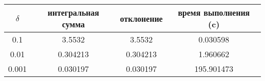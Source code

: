 \begin{tabular}{|c|c|c|c|}
    \hline
    $\delta$ & интегральная сумма & отклонение & время выполнения (c)\\
    \hline
    0.1 & 3.5532 & 3.5532 & 0.030598\\
    \hline
    0.01 & 0.304213 & 0.304213 & 1.960662\\
    \hline
    0.001 & 0.030197 & 0.030197 & 195.901473\\
    \hline
\end{tabular}
